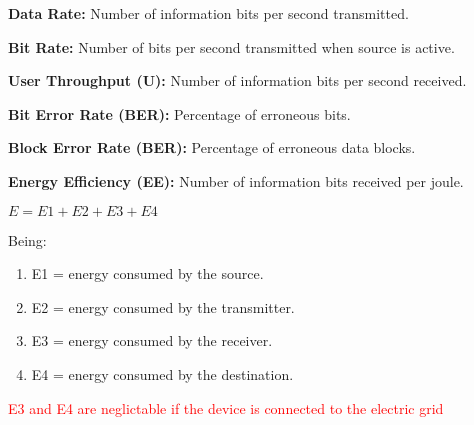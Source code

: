 \documentclass{article}
\theoremstyle{mytheoremstyle}
\theoremstyle{mytheoremstyle}
\theoremstyle{myproblemstyle}
\begin{document}
      \vspace{1cm}

      \textbf{Data Rate:} Number of information bits per second transmitted.
      
      \textbf{Bit Rate:} Number of bits per second transmitted when source is active.

      \textbf{User Throughput (U):} Number of information bits per second received.

      \textbf{Bit Error Rate (BER):} Percentage of erroneous bits.

      \textbf{Block Error Rate (BER):} Percentage of erroneous data blocks.

      \textbf{Energy Efficiency (EE):} Number of information bits received per joule.
      \begin{center} $E = E1 + E2 + E3 + E4$ \end{center}

      Being: 
      \begin{enumerate}[label=\textbullet]
          \item E1 = energy consumed by the source.
          \item E2 = energy consumed by the transmitter.
          \item E3 = energy consumed by the receiver.
          \item E4 = energy consumed by the destination.
        \end{enumerate}
         \textcolor{red}{E3 and E4 are neglictable if the device is connected to the electric grid}
      
    

    
\end{document}
